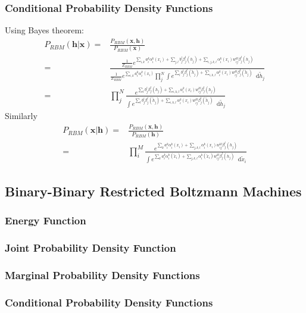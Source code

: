 \documentclass[twoside,english]{uiofysmaster}
\newcommand*\dif{\mathop{}\!\mathrm{d}}
\begin{document}
\subsubsection{Conditional Probability Density Functions}
Using Bayes theorem:
\begin{align}
	P_{RBM} (\bm{h}|\bm{x}) =& \frac{P_{RBM} (\bm{x}, \bm{h})}{P_{RBM} (\bm{x})} \nonumber \\
	=& \frac{\frac{1}{Z_{RBM}} e^{\sum_{i, k} a_i^k \alpha_i^k (x_i)
	+ \sum_{j, l} b_j^l \beta_j^l (h_j) 
	+ \sum_{i,j,k,l} \alpha_i^k (x_i) w_{ij}^{kl} \beta_j^l (h_j)}}
	{\frac{1}{Z_{RBM}} e^{\sum_{i, k} a_i^k \alpha_i^k (x_i)}
	\prod_j^N \int e^{\sum_l b_j^l \beta_j^l (\tilde{h}_j) + \sum_{i,k,l} \alpha_i^k (x_i) w_{ij}^{kl} \beta_j^l (\tilde{h}_j)}  \dif \tilde{h}_j} \nonumber \\
	=& \prod_j^N \frac{e^{\sum_l b_j^l \beta_j^l (h_j) + \sum_{i,k,l} \alpha_i^k (x_i) w_{ij}^{kl} \beta_j^l (h_j)} }
	{\int e^{\sum_l b_j^l \beta_j^l (\tilde{h}_j) + \sum_{i,k,l} \alpha_i^k (x_i) w_{ij}^{kl} \beta_j^l (\tilde{h}_j)}  \dif \tilde{h}_j}
\end{align}
Similarly
\begin{align}
	P_{RBM} (\bm{x}|\bm{h}) =&  \frac{P_{RBM} (\bm{x}, \bm{h})}{P_{RBM} (\bm{h})} \nonumber \\
	=& \prod_i^M \frac{e^{\sum_k a_i^k \alpha_i^k (x_i)
	+ \sum_{j,k,l} \alpha_i^k (x_i) w_{ij}^{kl} \beta_j^l (h_j)}}
	{\int e^{\sum_k a_i^k \alpha_i^k (\tilde{x}_i)
	+ \sum_{j,k,l} \alpha_i^k (\tilde{x}_i) w_{ij}^{kl} \beta_j^l (h_j)} \dif \tilde{x}_i}
\end{align}


\subsection{Binary-Binary Restricted Boltzmann Machines}
\subsubsection{Energy Function}
\subsubsection{Joint Probability Density Function}
\subsubsection{Marginal Probability Density Functions}
\subsubsection{Conditional Probability Density Functions}
\end{document}
